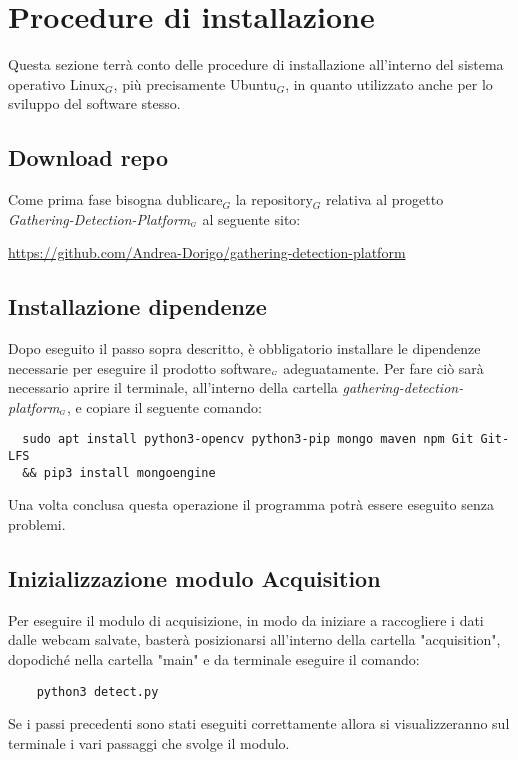 \chapter{Procedure di installazione}\label{ProceduraDiInstallazione}
Questa sezione terrà conto delle procedure di installazione all'interno del sistema operativo Linux$_G$, più precisamente Ubuntu$_G$, in quanto utilizzato anche per lo sviluppo del software stesso.

\section{Download repo}\label{ProceduraDiInstallazioneDownloadRepo}
Come prima fase bisogna dublicare$_G$ la repository$_G$ relativa al progetto \textit{Gathering-Detection-Platform$_{\scaleto{G}{3pt}}$} al seguente sito:
\begin{center}
  \item \url{https://github.com/Andrea-Dorigo/gathering-detection-platform}
\end{center}

\section{Installazione dipendenze}\label{ProceduraDiInstallazioneInstallazioneDipendenze}
Dopo eseguito il passo sopra descritto, è obbligatorio installare le dipendenze necessarie per eseguire il prodotto software$_{\scaleto{G}{3pt}}$ adeguatamente.
Per fare ciò sarà necessario aprire il terminale, all'interno della cartella \textit{gathering-detection-platform$_{\scaleto{G}{3pt}}$}, e copiare il seguente comando:
\begin{lstlisting}
  sudo apt install python3-opencv python3-pip mongo maven npm Git Git-LFS
  && pip3 install mongoengine
\end{lstlisting}

Una volta conclusa questa operazione il programma potrà essere eseguito senza problemi.

\section{Inizializzazione modulo Acquisition}\label{ProceduraDiInstallazioneInizializzazioneModuloAcquisition}
Per eseguire il modulo di acquisizione, in modo da iniziare a raccogliere i dati dalle webcam salvate, basterà posizionarsi all'interno della cartella "acquisition", dopodiché nella cartella "main" e da terminale eseguire il comando:
\begin{lstlisting}
    python3 detect.py
\end{lstlisting}
Se i passi precedenti sono stati eseguiti correttamente allora si visualizzeranno sul terminale i vari passaggi che svolge il modulo.

